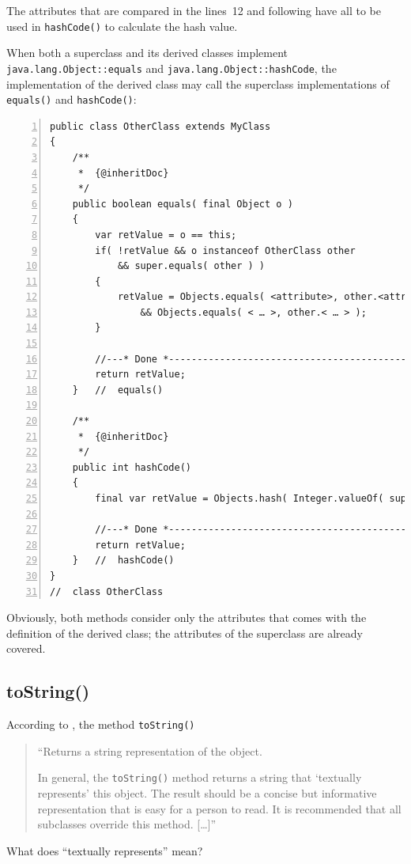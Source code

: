 \documentclass[11pt,a4paper, titlepage, parskip=half, headsepline, footsepline, cleardoublepage=current, headheight=1cm]{scrbook}
\begin{document}
The attributes that are compared in the lines~12 and following have all to be used in \lstinline|hashCode()| to calculate the hash value.

When both a superclass and its derived classes implement \lstinline|java.lang.Object::equals| and \lstinline|java.lang.Object::hashCode|, the implementation of the derived class may call the superclass implementations of \lstinline|equals()| and \lstinline|hashCode()|:
\begin{lstlisting}[numbers=left]
public class OtherClass extends MyClass
{
    /**
     *  {@inheritDoc}
     */
    public boolean equals( final Object o )
    {
        var retValue = o == this;
        if( !retValue && o instanceof OtherClass other
            && super.equals( other ) )
        {
            retValue = Objects.equals( <attribute>, other.<attribute> )
                && Objects.equals( < … >, other.< … > );
        }
            
        //---* Done *------------------------------------------------
        return retValue;
    }   //  equals()
    
    /**
     *  {@inheritDoc}
     */
    public int hashCode()
    {
        final var retValue = Objects.hash( Integer.valueOf( super.hashCode ), <attribute>, < … > );
        
        //---* Done *------------------------------------------------
        return retValue;
    }   //  hashCode()    
}
//  class OtherClass
\end{lstlisting}
Obviously, both methods consider only the attributes that comes with the definition of the derived class; the attributes of the superclass are already covered.

\subsection{toString()}\label{sec:ToString}
According to \autocite{ORACLE_DOC_OBJECT:toString}, the method \lstinline|toString()|
\begin{quotation}
“Returns a string representation of the object.

In general, the \lstinline|toString()| method returns a string that ‘textually represents’ this object. The result should be a concise but informative representation that is easy for a person to read. It is recommended that all subclasses override this method. […]”
\end{quotation}

What does “textually represents” mean?
\end{document}
